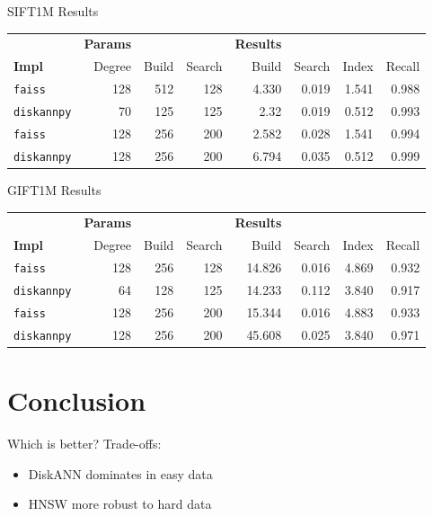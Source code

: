 {SIFT1M Results}
\begin{table}[ht]
    \begin{tabular}{l|rrr|rrrr}
        \toprule
        & \textbf{Params} & & & \textbf{Results} & & \\
        \textbf{Impl} & Degree & Build & Search & Build & Search & Index & Recall \\
        \midrule
        \texttt{faiss} & 128 & 512 & 128 & 4.330 & 0.019 & 1.541 & 0.988 \\
        \texttt{diskannpy} & 70 & 125 & 125 & 2.32 & 0.019 & 0.512 & 0.993 \\
        \midrule
        \texttt{faiss} & 128 & 256 & 200 & 2.582 & 0.028 & 1.541 & 0.994  \\
        \texttt{diskannpy} & 128 & 256 & 200 & 6.794 & 0.035 & 0.512 & 0.999 \\
        \bottomrule
    \end{tabular}
\end{table}


{GIFT1M Results}
\begin{table}[ht]
    \begin{tabular}{l|rrr|rrrr}
        \toprule
        & \textbf{Params} & & & \textbf{Results} & & \\
        \textbf{Impl} & Degree & Build & Search & Build & Search & Index & Recall \\
        \midrule
        \texttt{faiss} & 128 & 256 & 128 & 14.826 & 0.016 & 4.869 & 0.932 \\
        \texttt{diskannpy} & 64 & 128 & 125 & 14.233 & 0.112 & 3.840 & 0.917 \\
        \midrule
        \texttt{faiss} & 128 & 256 & 200 & 15.344 & 0.016 & 4.883 & 0.933 \\
        \texttt{diskannpy} & 128 & 256 & 200 & 45.608 & 0.025 & 3.840 & 0.971 \\
        \bottomrule
    \end{tabular}
\end{table}


\section{Conclusion}

{Which is better?}
Trade-offs:
\begin{itemize}
    \item DiskANN dominates in easy data
    \item HNSW more robust to hard data
\end{itemize}

